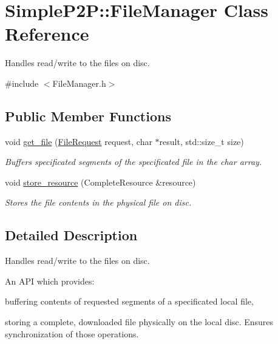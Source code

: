 \hypertarget{classSimpleP2P_1_1FileManager}{}\section{Simple\+P2P\+:\+:File\+Manager Class Reference}
\label{classSimpleP2P_1_1FileManager}


Handles read/write to the files on disc.  




{\ttfamily \#include $<$File\+Manager.\+h$>$}

\subsection*{Public Member Functions}
\begin{DoxyCompactItemize}
\item 
void \hyperlink{classSimpleP2P_1_1FileManager_a9f3fd7a6b4c695b79258448dc60b0b66}{get\+\_\+file} (\hyperlink{classSimpleP2P_1_1FileRequest}{File\+Request} request, char $\ast$result, std\+::size\+\_\+t size)
\begin{DoxyCompactList}\small\item\em Buffers specificated segments of the specificated file in the char array. \end{DoxyCompactList}\item 
void \hyperlink{classSimpleP2P_1_1FileManager_a6bc1cab4cfac8c75186147b9bf1f29e3}{store\+\_\+resource} (Complete\+Resource \&resource)
\begin{DoxyCompactList}\small\item\em Stores the file contents in the physical file on disc. \end{DoxyCompactList}\end{DoxyCompactItemize}


\subsection{Detailed Description}
Handles read/write to the files on disc. 

An A\+PI which provides\+:
\begin{DoxyItemize}
\item buffering contents of requested segments of a specificated local file,
\item storing a complete, downloaded file physically on the local disc. Ensures synchronization of those operations. 
\end{DoxyItemize}

